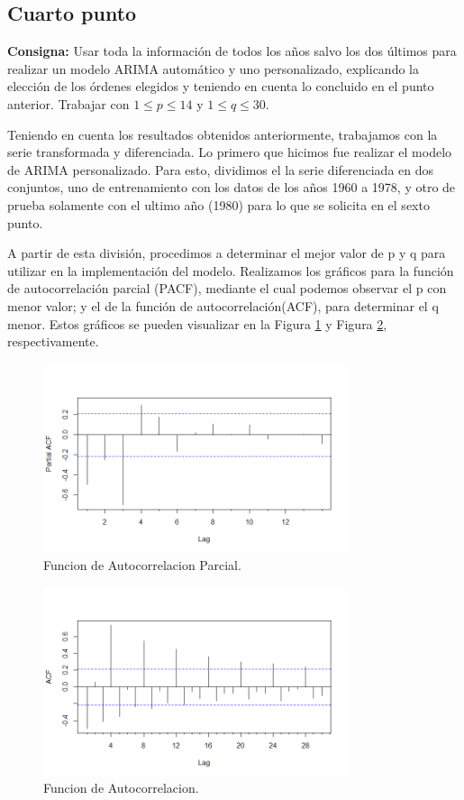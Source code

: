 \documentclass{article} %
\begin{document}
\subsection{Cuarto punto}

\textbf{Consigna:} Usar toda la información de todos los años salvo los dos últimos para realizar un modelo ARIMA automático y uno personalizado, explicando la elección de los órdenes elegidos y teniendo en cuenta lo concluido en el punto anterior. Trabajar con  $1 \leq p \leq 14$ y $1 \leq q \leq 30$.

Teniendo en cuenta los resultados obtenidos anteriormente, trabajamos con la serie transformada y diferenciada. Lo primero que hicimos fue realizar el modelo de ARIMA personalizado. Para esto, dividimos el la serie diferenciada en dos conjuntos, uno de entrenamiento con los datos de los años 1960 a 1978, y otro de prueba solamente con el ultimo año (1980) para lo que se solicita en el sexto punto. 

A partir de esta división, procedimos a determinar el mejor valor de p y q para utilizar en la implementación del modelo. Realizamos los gráficos para la función de autocorrelación parcial (PACF), mediante el cual podemos observar el p con menor valor; y el de la función de autocorrelación(ACF), para determinar el q menor. Estos gráficos se pueden visualizar en la Figura \ref{fig:PACF} y Figura \ref{fig:ACF}, respectivamente. 

\begin{figure}[H]
	\centering
	\includegraphics[width=0.8\textwidth]{images/4-8 PACF}
	\caption{Funcion de Autocorrelacion Parcial.}
	\label{fig:PACF}
\end{figure} 
\begin{figure}[H]
	\centering
	\includegraphics[width=0.8\textwidth]{images/4-9 ACF}
	\caption{Funcion de Autocorrelacion.}
	\label{fig:ACF}
\end{figure} 
\end{document}
